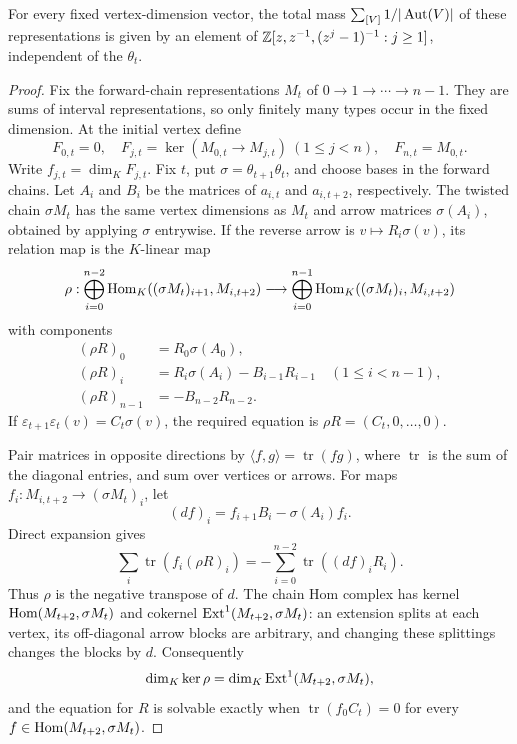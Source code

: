 \begin{proposition}\label{prop:squaretotal}
For every fixed vertex-dimension vector, the total mass $\sum_{[V]}1/|\operatorname{Aut}(V)|$ of these representations is given by an element of $\mathbb Z[z,z^{-1},(z^j-1)^{-1}:j\ge1]$, independent of the $\theta_t$.
\end{proposition}
\begin{proof}
Fix the forward-chain representations $M_t$ of $0\to1\to\cdots\to n-1$. They are sums of interval representations, so only finitely many types occur in the fixed dimension. At the initial vertex define
\[
 F_{0,t}=0,\quad F_{j,t}=\ker(M_{0,t}\to M_{j,t})\ (1\le j<n),\quad F_{n,t}=M_{0,t}.
\]
Write $f_{j,t}=\dim_KF_{j,t}$. Fix $t$, put $\sigma=\theta_{t+1}\theta_t$, and choose bases in the forward chains. Let $A_i$ and $B_i$ be the matrices of $a_{i,t}$ and $a_{i,t+2}$, respectively. The twisted chain $\sigma M_t$ has the same vertex dimensions as $M_t$ and arrow matrices $\sigma(A_i)$, obtained by applying $\sigma$ entrywise. If the reverse arrow is $v\mapsto R_i\sigma(v)$, its relation map is the $K$-linear map
\[
 \rho:\bigoplus_{i=0}^{n-2}\operatorname{Hom}_K((\sigma M_t)_{i+1},M_{i,t+2})
 \longrightarrow\bigoplus_{i=0}^{n-1}\operatorname{Hom}_K((\sigma M_t)_i,M_{i,t+2})
\]
with components
\begin{align*}
 (\rho R)_0&=R_0\sigma(A_0),\\
 (\rho R)_i&=R_i\sigma(A_i)-B_{i-1}R_{i-1}\quad(1\le i<n-1),\\
 (\rho R)_{n-1}&=-B_{n-2}R_{n-2}.
\end{align*}
If $\varepsilon_{t+1}\varepsilon_t(v)=C_t\sigma(v)$, the required equation is $\rho R=(C_t,0,\ldots,0)$.

Pair matrices in opposite directions by $\langle f,g\rangle=\operatorname{tr}(fg)$, where $\operatorname{tr}$ is the sum of the diagonal entries, and sum over vertices or arrows. For maps $f_i:M_{i,t+2}\to(\sigma M_t)_i$, let
\[
 (df)_i=f_{i+1}B_i-\sigma(A_i)f_i.
\]
Direct expansion gives
\[
 \sum_i\operatorname{tr}(f_i(\rho R)_i)
 =-\sum_{i=0}^{n-2}\operatorname{tr}((df)_iR_i).
\]
Thus $\rho$ is the negative transpose of $d$. The chain Hom complex has kernel $\operatorname{Hom}(M_{t+2},\sigma M_t)$ and cokernel $\operatorname{Ext}^1(M_{t+2},\sigma M_t)$: an extension splits at each vertex, its off-diagonal arrow blocks are arbitrary, and changing these splittings changes the blocks by $d$. Consequently
\[
 \dim_K\ker\rho=\dim_K\operatorname{Ext}^1(M_{t+2},\sigma M_t),
\]
and the equation for $R$ is solvable exactly when $\operatorname{tr}(f_0C_t)=0$ for every $f\in\operatorname{Hom}(M_{t+2},\sigma M_t)$.


\end{proof}

